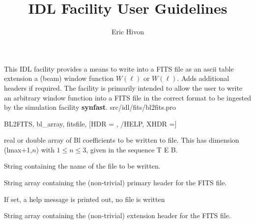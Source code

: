 



\sloppy



\title{\healpix IDL Facility User Guidelines}
 \section[bl2fits]{ }
\label{idl:bl2fits}
\author{Eric Hivon}




\begin{facility}
{This IDL facility provides a means to
write into a FITS file as an ascii table extension a (beam) window function
$W(\ell)$ or $W(\ell)$. Adds additional
headers if required. The facility is primarily intended to allow the
user to write an arbitrary window function into a FITS file in 
the correct format to be ingested by the \healpix simulation facility 
\textbf{synfast}.
}
{src/idl/fits/bl2fits.pro}
\end{facility}

\begin{IDLformat}
{BL2FITS, bl\_array, fitsfile, [HDR = , /HELP, XHDR =]}
\end{IDLformat}

\begin{qualifiers}
  \begin{qulist}{} %
    \item[bl\_array] real or double array of Bl coefficients to be written to
      file. This has dimension (lmax+1,$n$) with $1\le n \le 3$, given in the sequence T E B.
    \item[fitsfile] String containing the name of the file to be written.
  \end{qulist}
\end{qualifiers}

\begin{keywords}
  \begin{kwlist}{} %
    \item[HDR =] String array containing the (non-trivial) primary header
      for the FITS file. 
    \item[/HELP] If set, a help message is printed out, no file is written

    \item[XHDR =] String array containing the (non-trivial) extension header
      for the FITS file. 

  \end{kwlist}
\end{keywords}  

